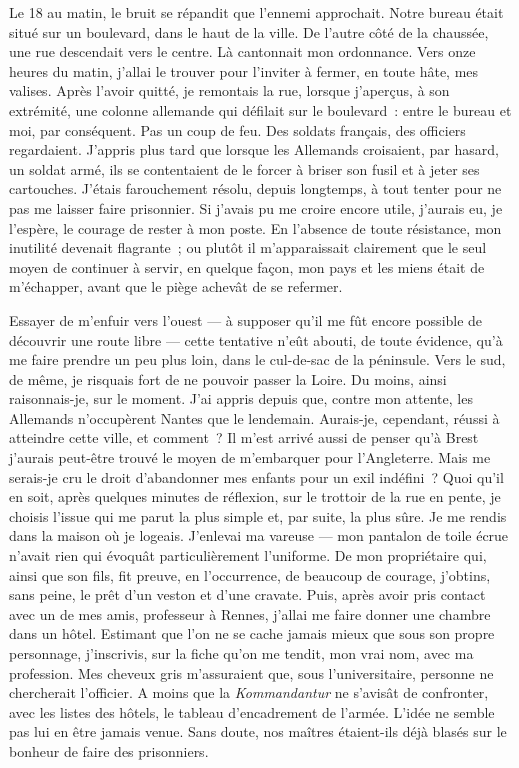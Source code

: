 \documentclass[french,twoside]{book} %
\begin{document}
Le 18 au matin, le bruit se répandit que l’ennemi approchait. Notre bureau était situé sur un boulevard, dans le haut de la ville. De l’autre côté de la chaussée, une rue descendait vers le centre. Là cantonnait mon ordonnance. Vers onze heures du matin, j’allai le trouver pour l’inviter à fermer, en toute hâte, mes valises. Après l’avoir quitté, je remontais la rue, lorsque j’aperçus, à son extrémité, une colonne allemande qui défilait sur le boulevard : entre le bureau et moi, par conséquent. Pas un coup de feu. Des soldats français, des officiers regardaient. J’appris plus tard que lorsque les Allemands croisaient, par hasard, un soldat armé, ils se contentaient de le forcer à briser son fusil et à jeter ses cartouches. J’étais farouchement résolu, depuis longtemps, à tout tenter pour ne pas me laisser faire prisonnier. Si j’avais pu me croire encore utile, j’aurais eu, je l’espère, le courage de rester à mon poste. En l’absence de toute résistance, mon inutilité devenait flagrante ; ou plutôt il m’apparaissait clairement que le seul moyen de continuer à servir, en quelque façon, mon pays et les miens était de m’échapper, avant que le piège achevât de se refermer.\par
Essayer de m’enfuir vers l’ouest — à supposer qu’il me fût encore possible de découvrir une route libre — cette tentative n’eût abouti, de toute évidence, qu’à me faire prendre un peu plus loin, dans le cul-de-sac de la péninsule. Vers le sud, de même, je risquais fort de ne pouvoir passer la Loire. Du moins, ainsi raisonnais-je, sur le moment. J’ai appris depuis que, contre mon attente, les Allemands n’occupèrent Nantes que le lendemain. Aurais-je,   cependant, réussi à atteindre cette ville, et comment ? Il m’est arrivé aussi de penser qu’à Brest j’aurais peut-être trouvé le moyen de m’embarquer pour l’Angleterre. Mais me serais-je cru le droit d’abandonner mes enfants pour un exil indéfini ? Quoi qu’il en soit, après quelques minutes de réflexion, sur le trottoir de la rue en pente, je choisis l’issue qui me parut la plus simple et, par suite, la plus sûre. Je me rendis dans la maison où je logeais. J’enlevai ma vareuse — mon pantalon de toile écrue n’avait rien qui évoquât particulièrement l’uniforme. De mon propriétaire qui, ainsi que son fils, fit preuve, en l’occurrence, de beaucoup de courage, j’obtins, sans peine, le prêt d’un veston et d’une cravate. Puis, après avoir pris contact avec un de mes amis, professeur à Rennes, j’allai me faire donner une chambre dans un hôtel. Estimant que l’on ne se cache jamais mieux que sous son propre personnage, j’inscrivis, sur la fiche qu’on me tendit, mon vrai nom, avec ma profession. Mes cheveux gris m’assuraient que, sous l’universitaire, personne ne chercherait l’officier. A moins que la \emph{Kommandantur} ne s’avisât de confronter, avec les listes des hôtels, le tableau d’encadrement de l’armée. L’idée ne semble pas lui en être jamais venue. Sans doute, nos maîtres étaient-ils déjà blasés sur le bonheur de faire des prisonniers.\par
\end{document}

